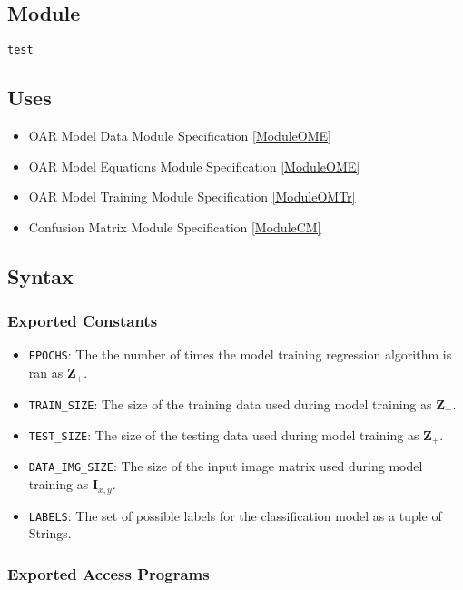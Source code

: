 \documentclass[12pt, titlepage]{article}
\def\code#1{\texttt{#1}}
\begin{document}
\subsection{Module}

\code{test}

\subsection{Uses}

\begin{itemize}
  \item OAR Model Data Module Specification \ref{ModuleOME}
  \item OAR Model Equations Module Specification \ref{ModuleOME}
  \item OAR Model Training Module Specification \ref{ModuleOMTr}
  \item Confusion Matrix Module Specification \ref{ModuleCM}
\end{itemize}

\subsection{Syntax}

\subsubsection{Exported Constants}

\begin{itemize}
\item \code{EPOCHS}: The the number of times the model training regression algorithm is ran as $\mathbf{Z}_{+}$.
\item \code{TRAIN_SIZE}: The size of the training data used during model training as $\mathbf{Z}_{+}$.
\item \code{TEST_SIZE}: The size of the testing data used during model training as $\mathbf{Z}_{+}$.
\item \code{DATA_IMG_SIZE}: The size of the input image matrix used during model training as $\mathbf{I}_{x,y}$.
\item \code{LABELS}: The set of possible labels for the classification model as a tuple of Strings.
\end{itemize}

\subsubsection{Exported Access Programs}
\end{document}
